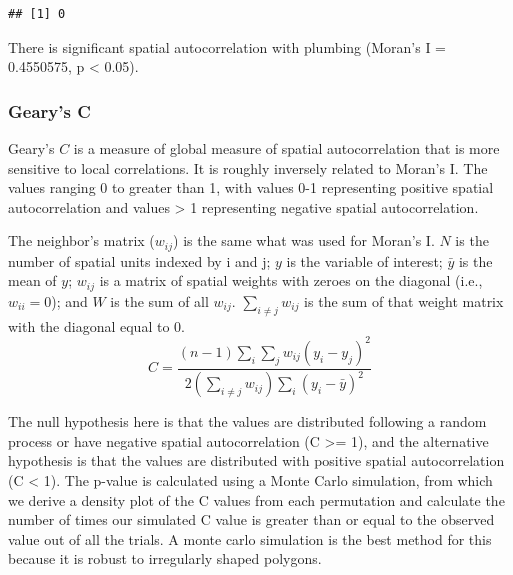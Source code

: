 \documentclass[
]{article}
\newenvironment{Shaded}{\begin{snugshade}}{\end{snugshade}}
\newcommand{\ControlFlowTok}[1]{\textcolor[rgb]{0.13,0.29,0.53}{\textbf{#1}}}
\newcommand{\DecValTok}[1]{\textcolor[rgb]{0.00,0.00,0.81}{#1}}
\newcommand{\DocumentationTok}[1]{\textcolor[rgb]{0.56,0.35,0.01}{\textbf{\textit{#1}}}}
\newcommand{\FunctionTok}[1]{\textcolor[rgb]{0.00,0.00,0.00}{#1}}
\newcommand{\NormalTok}[1]{#1}
\newcommand{\OtherTok}[1]{\textcolor[rgb]{0.56,0.35,0.01}{#1}}
\newcommand{\SpecialCharTok}[1]{\textcolor[rgb]{0.00,0.00,0.00}{#1}}
\newcommand{\StringTok}[1]{\textcolor[rgb]{0.31,0.60,0.02}{#1}}
\begin{document}
\begin{Shaded}
\end{Shaded}

\begin{verbatim}
## [1] 0
\end{verbatim}

There is significant spatial autocorrelation with plumbing (Moran's I =
0.4550575, p \textless{} 0.05).

\hypertarget{gearys-c}{%
\subsubsection{Geary's C}\label{gearys-c}}

Geary's \(C\) is a measure of global measure of spatial autocorrelation
that is more sensitive to local correlations. It is roughly inversely
related to Moran's I. The values ranging 0 to greater than 1, with
values 0-1 representing positive spatial autocorrelation and values
\textgreater{} 1 representing negative spatial autocorrelation.

The neighbor's matrix (\(w_{ij}\)) is the same what was used for Moran's
I. \(N\) is the number of spatial units indexed by i and j; \(y\) is the
variable of interest; \(\bar{y}\) is the mean of \(y\); \(w_{ij}\) is a
matrix of spatial weights with zeroes on the diagonal (i.e.,
\(w_{ii}=0\)); and \(W\) is the sum of all \(w_{ij}\).
\(\sum_{i \neq j} w_{i j}\) is the sum of that weight matrix with the
diagonal equal to 0.\\
\[
C=\frac{(n-1) \sum_{i} \sum_{j} w_{i j}\left(y_{i}-y_{j}\right)^{2}}{2\left(\sum_{i \neq j} w_{i j}\right) \sum_{i}\left(y_{i}-\bar{y}\right)^{2}}
\]

The null hypothesis here is that the values are distributed following a
random process or have negative spatial autocorrelation (C \textgreater=
1), and the alternative hypothesis is that the values are distributed
with positive spatial autocorrelation (C \textless{} 1). The p-value is
calculated using a Monte Carlo simulation, from which we derive a
density plot of the C values from each permutation and calculate the
number of times our simulated C value is greater than or equal to the
observed value out of all the trials. A monte carlo simulation is the
best method for this because it is robust to irregularly shaped
polygons.
\end{document}
